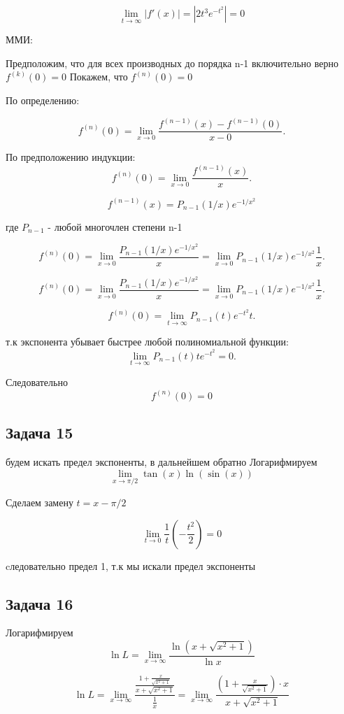 \documentclass[a4paper,12pt]{article}
\begin{document}
\[
\lim_{t \to \infty}|f'(x)| = |2t^3e^{-t^2}| = 0
\]

ММИ:

Предположим, что для всех производных до порядка n-1 включительно верно $f^{(k)}(0)=0$ Покажем, что $f^{(n)}(0) = 0$

По определению: 

\[
f^{(n)}(0) = \lim_{x \to 0} \frac{f^{(n-1)}(x) - f^{(n-1)}(0)}{x-0}.
\]

По предположению индукции:
\[
f^{(n)}(0) = \lim_{x \to 0}\frac{f^{(n-1)}(x)}{x}.
\]

\[
f^{(n-1)}(x) = P_{n-1}(1/x) e^{-1/x^2}
\]

где $P_{n-1}$ - любой многочлен степени n-1

\[
    f^{(n)}(0) = \lim_{x \to 0}\frac{P_{n-1}(1/x)e^{-1/x^2}}{x} = \lim_{x \to 0}P_{n-1}(1/x)e^{-1/x^2}\frac{1}{x}.
\]

\[
    f^{(n)}(0) = \lim_{x \to 0}\frac{P_{n-1}(1/x)e^{-1/x^2}}{x} = \lim_{x \to 0}P_{n-1}(1/x)e^{-1/x^2}\frac{1}{x}.
\]

\[
    f^{(n)}(0) = \lim_{t \to \infty} P_{n-1}(t) e^{-t^2} t.
\]

т.к экспонента убывает быстрее любой полиномиальной функции:
\[
    \lim_{t \to \infty} P_{n-1}(t)t e^{-t^2} = 0.
\]

Следовательно 
\[
    f^{(n)}(0) = 0
\]

\subsection{Задача 15}
будем искать предел экспоненты, в дальнейшем обратно Логарифмируем
\[
\lim_{x \to \pi/2} \tan(x)\ln(\sin(x))
\]

Сделаем замену $t = x-\pi/2$

\[
\lim_{t \to 0} \frac{1}{t}(-\frac{t^2}{2}) = 0
\]

cледовательно предел 1, т.к мы искали предел экспоненты

\subsection{Задача 16}
Логарифмируем
\[
\ln L = \lim_{x \to \infty} \frac{\ln\left( x + \sqrt{x^2 + 1} \right)}{\ln x}
\]

\[
\ln L = \lim_{x \to \infty} \frac{\frac{1 + \frac{x}{\sqrt{x^2 + 1}}}{x + \sqrt{x^2 + 1}}}{\frac{1}{x}} = \lim_{x \to \infty} \frac{\left(1 + \frac{x}{\sqrt{x^2 + 1}}\right) \cdot x}{x + \sqrt{x^2 + 1}}
\]
\end{document}
